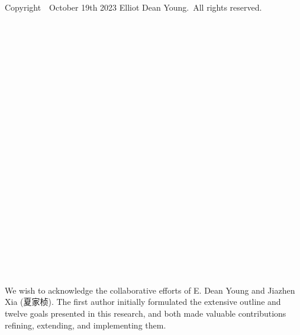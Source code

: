 \documentclass{book}
\theoremstyle{definition}
\begin{document}
\thispagestyle{empty}


\newpage


\begin{center}

\pagecolor{white}
\color{black}




\end{center}

\thispagestyle{empty}




\newpage
\pagecolor{white}
\color{black}
\ \\
\ \\
\thispagestyle{empty}
\begin{center}
Copyright\ \textcopyright \ October 19th 2023 Elliot Dean Young.\ All rights reserved.\\
\end{center}
\large %
\newpage 
\ \\
\ \\
\ \\
\ \\
\ \\
\ \\
\ \\
\ \\
\ \\
\ \\
\ \\
\thispagestyle{empty}
 
\newpage



\newpage

\ \\
\ \\
\ \\
\ \\
\ \\
\ \\
\ \\
\ \\
\ \\
\ \\
\ \\

We wish to acknowledge the collaborative efforts of E. Dean Young and Jiazhen Xia (夏家桢). The first author initially formulated the extensive outline and twelve goals presented in this research, and both made valuable contributions refining, extending, and implementing them.\\

\end{document}
